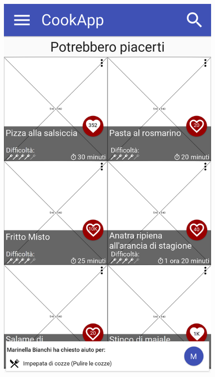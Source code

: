 \begin{figure}[H]
	\begin{minipage}{.49\textwidth}
		\includegraphics[width=\textwidth]{img/wireframe/homepage_aiuto_passo_ricetta.png}
	\end{minipage}
	\begin{minipage}{.49\textwidth}

\end{minipage}
\end{figure}

